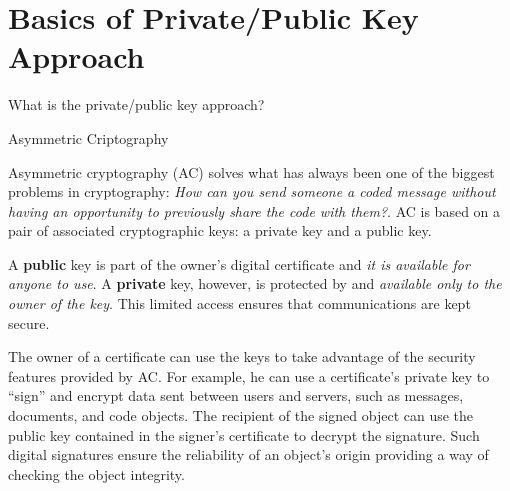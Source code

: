 \section{Basics of Private/Public Key Approach}
\begin{frame}[t,fragile]{What is the private/public key approach?}
  \begin{block}{Asymmetric Criptography}
    {\footnotesize
\alert{Asymmetric cryptography} (AC) solves what has always been one of the biggest problems in cryptography: \emph{How can you send someone a coded message without having an opportunity to previously share the code with them?}. AC is based on a pair of associated cryptographic
keys: a \alert{private} key and a \alert{public} key. 

\vspace{0.25cm}
A \textbf{public} key is part of the owner's digital certificate and \emph{it is available for anyone to use}. A \textbf{private} key, however, is protected by and \emph{available only to the owner of the key}. This limited access ensures that communications are kept secure.

\vspace{0.25cm}
The owner of a certificate can use the keys to take advantage of the
security features provided by AC. For example,
he can use a certificate's private key to ``sign''
and encrypt data sent between users and servers, such as messages,
documents, and code objects. The recipient of the signed object can
use the public key contained in the signer's certificate to
decrypt the signature. Such digital signatures ensure the reliability
of an object's origin providing a way of checking the object integrity.
}
  \end{block}
  
\end{frame}
